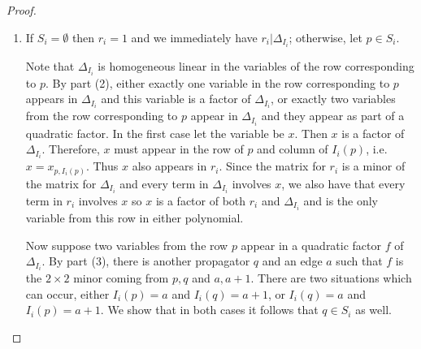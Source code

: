 \documentclass[11pt]{article}
\theoremstyle{remark}
\theoremstyle{definition}
\begin{document}
\begin{proof}
\begin{enumerate}
Now let $f$ be a quadratic factor of $\Delta_{I_i}$.  By part (2) we know that $f$ is a $2\times 2$ minor coming from two propagators, call them $p$ and $q$, and two vertices, call them $a$ and $b$, and assume that $a <_i b$.  It remains to show that $b = a+1$.  From this we can conclude that $p$ and $q$ each have one end on edge $a$. 

As in the proof of part (2), make a new admissible diagram by removing the propagators which come before those contributing to $f$ in the order imposed by $I_i$.  Without loss of generality we may assume $i=a$. The cases in the proof of part (2) show how $\Delta_{I_i}$ factors. In particular the vertices supporting the other end of $p$ either do not appear in $I_i$, or they contribute to a different factor of $\Delta_{I_i}$ than $p$ and $a$ do.  By assumption $b$ contributes to the same factor as $a$.  Therefore, $(a,b)$ is an edge defining an end of $p$, that is, $b = a+1$.

\item If $S_i = \emptyset$ then $r_i = 1$ and we immediately have $r_i | \Delta_{I_i}$; otherwise, let $p\in S_i$. 

Note that $\Delta_{I_i}$ is homogeneous linear in the variables of the row corresponding to $p$.  By part (2), either exactly one variable in the row corresponding to $p$ appears in $\Delta_{I_i}$ and this variable is a factor of $\Delta_{I_i}$, or exactly two variables from the row corresponding to $p$ appear in $\Delta_{I_i}$ and they appear as part of a quadratic factor.  In the first case let the variable be $x$. Then $x$ is a factor of $\Delta_{I_i}$. Therefore, $x$ must appear in the row of $p$ and column of $I_i(p)$, i.e. $x = x_{p, I_i(p)}$. Thus $x$ also appears in $r_i$. Since the matrix for $r_i$ is a minor of the matrix for $\Delta_{I_i}$ and every term in $\Delta_{I_i}$ involves $x$, we also have that every term in $r_i$ involves $x$ so $x$ is a factor of both $r_i$ and $\Delta_{I_i}$ and is the only variable from this row in either polynomial.

  Now suppose two variables from the row $p$ appear in a quadratic factor $f$ of $\Delta_{I_i}$.  By part (3), there is another propagator $q$ and an edge $a$ such that $f$ is the $2\times 2$ minor coming from $p, q$ and $a, a+1$.  There are two situations which can occur, either $I_i(p)=a$ and $I_i(q)=a+1$, or $I_i(q)=a$ and $I_i(p)=a+1$. 
    We show that in both cases it follows that $q \in S_i$ as well.


\end{enumerate}
\end{proof}
\end{document}
